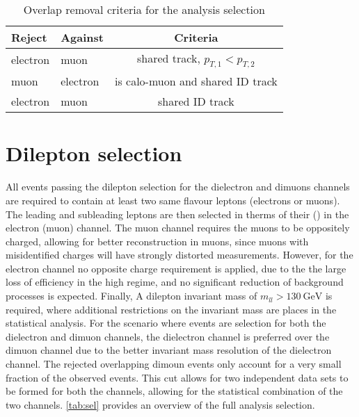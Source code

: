 \begin{table}[]
   \centering
   {
   \begin{tabular}{l|l||c}
 \hline
     Reject & Against & Criteria \\
     \hline
     electron & muon & shared track, $p_{T,1} < p_{T,2}$ \\
     muon & electron & is calo-muon and shared ID track \\
     electron & muon & shared ID track \\
 \hline
   \end{tabular}
   }
   \caption[Overlap removal criteria for the analysis selection]{Overlap removal criteria for the analysis selection}
   \label{tab:sel:overlap}
 \end{table}

\section{Dilepton selection}
All events passing the dilepton selection for the dielectron and dimuons channels are required to contain at least two same flavour leptons (electrons or muons). The leading and subleading leptons are then selected in therms of their \et (\pt) in the electron (muon) channel. The muon channel requires the muons to be oppositely charged, allowing for better \pt reconstruction in muons, since muons with misidentified charges will have strongly distorted \pt measurements. However, for the electron channel no opposite charge requirement is applied, due to the the large loss of efficiency in the high \et regime, and no significant reduction of background processes is expected. Finally, A dilepton invariant mass of $m_{ll} > \SI{130}{\giga\electronvolt}$ is required, where additional restrictions on the invariant mass are places in the statistical analysis. For the scenario where events are selection for both the dielectron and dimuon channels, the dielectron channel is preferred over the dimuon channel due to the better invariant mass resolution of the dielectron channel. The rejected overlapping dimoun events only account for a very small fraction of the observed events. This cut allows for two independent data sets to be formed for both the channels, allowing for the statistical combination of the two channels. \cref{tab:sel} provides an overview of the full analysis selection. 

